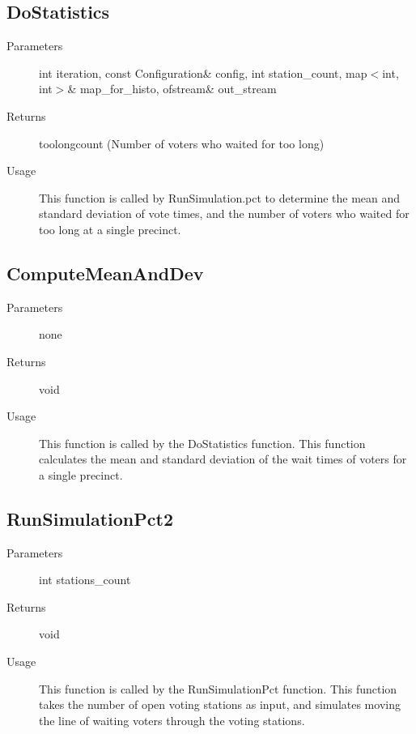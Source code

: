 \subsection{DoStatistics}
\begin{description}
\item[Parameters] int iteration, const Configuration\& config, int station\_count, map$<$int, int$>$\& map\_for\_histo, ofstream\& out\_stream
\item[Returns] toolongcount (Number of voters who waited for too long)
\item[Usage] This function is called by RunSimulation.pct to determine the mean and standard deviation of vote times, and the number of voters who waited for too long at a single precinct.
\end{description}

\subsection{ComputeMeanAndDev}
\begin{description}
\item[Parameters] none
\item[Returns] void
\item[Usage] This function is called by the DoStatistics function.  This function calculates the mean and standard deviation of the wait times of voters for a single precinct.
\end{description}

\subsection{RunSimulationPct2}
\begin{description}
\item[Parameters] int stations\_count
\item[Returns] void
\item[Usage] This function is called by the RunSimulationPct function.  This function takes the number of open voting stations as input, and simulates moving the line of waiting voters through the voting stations.
\end{description}


